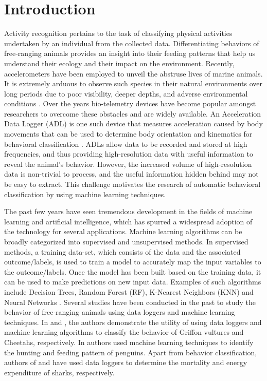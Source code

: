 \documentclass[conference]{IEEEtran}
\begin{document}
\section{Introduction}
Activity recognition pertains to the task of classifying physical activities undertaken by an individual from the collected data. Differentiating behaviors of free-ranging animals provides an insight into their feeding patterns that help us understand their ecology and their impact on the environment. Recently, accelerometers have been employed to unveil the abstruse lives of marine animals.   It is extremely arduous to observe such species in their natural environments over long periods due to poor visibility, deeper depths, and adverse environmental conditions \cite{1}. Over the years bio-telemetry devices have become popular amongst researchers to overcome these obstacles and are widely available. An Acceleration Data Logger (ADL) is one such device that measures acceleration caused by body movements that can be used to determine body orientation and kinematics for behavioral classification \cite{1}. ADLs allow data to be recorded and stored at high frequencies, and thus providing high-resolution data with useful information to reveal the animal’s behavior. However, the increased   volume of high-resolution data is non-trivial to process, and the useful information hidden behind may not be easy to extract. This challenge motivates the research of automatic behavioral classification by using machine learning techniques.

The past few years have seen tremendous development in the fields of machine learning and artificial intelligence, which has spurred a widespread adoption of the technology for several applications. Machine learning algorithms can be broadly categorized into supervised and unsupervised methods. In supervised methods, a training data-set, which consists of the data and the associated outcome/labels, is used to train a model to accurately map the input variables to the outcome/labels. Once the model has been built based on the training data, it can be used to make predictions on new input data. Examples of such algorithms include Decision Trees, Random Forest (RF), K-Nearest Neighbors (KNN) and Neural Networks \cite{1}. 
Several studies have been conducted in the past to study the behavior of free-ranging animals using data loggers and machine learning techniques. In  \cite{2} and  \cite{3}, the authors demonstrate the utility of using data loggers and machine learning algorithms to classify the behavior of Griffon vultures and Cheetahs, respectively. In  \cite{4} authors used machine learning techniques to identify the hunting and feeding pattern of penguins. Apart from behavior classification, authors of  \cite{5} and  \cite{6} have used data loggers to determine the mortality and energy expenditure of sharks, respectively.
\end{document}
